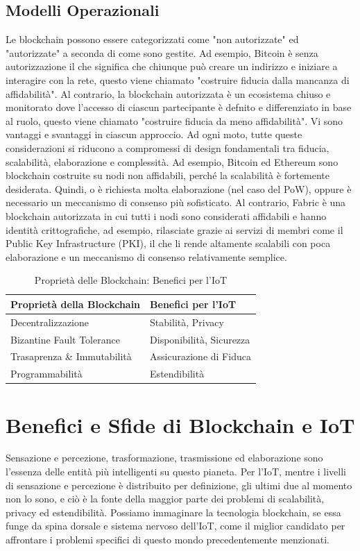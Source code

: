 \documentclass[a4paper,12pt]{article}
\begin{document}
\subsection{Modelli Operazionali}
Le blockchain possono essere categorizzati come "non autorizzate" ed "autorizzate" a seconda di come sono gestite. Ad esempio, Bitcoin è senza autorizzazione il che significa che chiunque può creare un indirizzo e iniziare a interagire con la rete, questo viene chiamato "costruire fiducia dalla mancanza di affidabilità". Al contrario, la blockchain autorizzata è un ecosistema chiuso e monitorato dove l'accesso di ciascun partecipante è defnito e differenziato in base al ruolo, questo viene chiamato "costruire fiducia da meno affidabilità".
Vi sono vantaggi e svantaggi in ciascun approccio. Ad ogni moto, tutte queste considerazioni si riducono a compromessi di design fondamentali tra fiducia, scalabilità, elaborazione e complessità. Ad esempio, Bitcoin ed Ethereum sono blockchain costruite su nodi non affidabili, perché la scalabilità è fortemente desiderata. Quindi, o è richiesta molta elaborazione (nel caso del PoW), oppure è necessario un meccanismo di consenso più sofisticato. Al contrario, Fabric \cite{c14} è una blockchain autorizzata in cui tutti i nodi sono considerati affidabili e hanno identità crittografiche, ad esempio, rilasciate grazie ai servizi di membri come il Public Key Infrastructure (PKI), il che li rende altamente scalabili con poca elaborazione e un meccanismo di consenso relativamente semplice.

\begin{table}[tp]%
	\caption{Proprietà delle Blockchain: Benefici per l'IoT}
	\label{table:BlockchainBenefits}\centering %
	\begin{tabular}{l|l}
		\hline
		Proprietà della Blockchain  & Benefici per l'IoT       \\
		\hline
		Decentralizzazione          & Stabilità, Privacy       \\
		Bizantine Fault Tolerance   & Disponibilità, Sicurezza \\
		Trasaprenza \& Immutabilità & Assicurazione di Fiduca  \\
		Programmabilità             & Estendibilità            \\
		\hline
	\end{tabular}
\end{table}

\section{Benefici e Sfide di Blockchain e IoT}
Sensazione e percezione, trasformazione, trasmissione ed elaborazione sono l'essenza delle entità più intelligenti su questo pianeta. Per l'IoT, mentre i livelli di sensazione e percezione è distribuito per definizione, gli ultimi due al momento non lo sono, e ciò è la fonte della maggior parte dei problemi di scalabilità, privacy ed estendibilità. Possiamo immaginare la tecnologia blockchain, se essa funge da spina dorsale e sistema nervoso dell'IoT, come il miglior candidato per affrontare i problemi specifici di questo mondo precedentemente menzionati.
\end{document}
